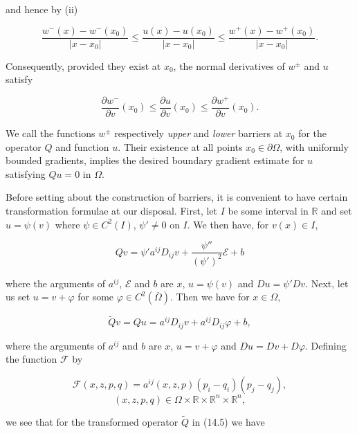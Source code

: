 
and hence by (ii)

\[
\frac{w^-(x)-w^-(x_0)}{|x-x_0|}\leq \frac{u(x)-u(x_0)}{|x-x_0|}\leq \frac{w^+(x)-w^+(x_0)}{|x-x_0|}.
\]

Consequently, provided they exist at $x_0$, the normal derivatives of $w^\pm$ and $u$ satisfy

\begin{equation}
\frac{\partial w^-}{\partial v}(x_0)\leq \frac{\partial u}{\partial v}(x_0)\leq \frac{\partial w^+}{\partial v}(x_0).
\tag{14.3}
\end{equation}

We call the functions $w^\pm$ respectively \emph{upper} and \emph{lower} barriers at $x_0$ for the operator
$Q$ and function $u$. Their existence at all points $x_0\in\partial\Omega$, with uniformly bounded
gradients, implies the desired boundary gradient estimate for $u$ satisfying $Qu=0$
in $\Omega$.

    Before setting about the construction of barriers, it is convenient to have certain
transformation formulae at our disposal. First, let $I$ be some interval in $\mathbb{R}$ and set
$u=\psi(v)$ where $\psi\in C^2(I)$, $\psi'\neq 0$ on $I$. We then have, for $v(x)\in I$,

\begin{equation}
Qv=\psi' a^{ij}D_{ij}v+\frac{\psi''}{(\psi')^2}\mathcal E+b
\tag{14.4}
\end{equation}

where the arguments of $a^{ij}$, $\mathcal E$ and $b$ are $x$, $u=\psi(v)$ and $Du=\psi' Dv$. Next, let us
set $u=v+\varphi$ for some $\varphi\in C^2(\overline{\Omega})$. Then we have for $x\in \Omega$,

\begin{equation}
\widetilde{Q}v=Qu=a^{ij}D_{ij}v+a^{ij}D_{ij}\varphi+b,
\tag{14.5}
\end{equation}

where the arguments of $a^{ij}$ and $b$ are $x$, $u=v+\varphi$ and $Du=Dv+D\varphi$. Defining
the function $\mathcal F$ by

\begin{equation}
\mathcal F(x,z,p,q)=a^{ij}(x,z,p)(p_i-q_i)(p_j-q_j),
\tag{14.6}
\end{equation}
\[
(x,z,p,q)\in \Omega\times \mathbb{R}\times \mathbb{R}^n\times \mathbb{R}^n,
\]

we see that for the transformed operator $\widetilde{Q}$ in (14.5) we have


